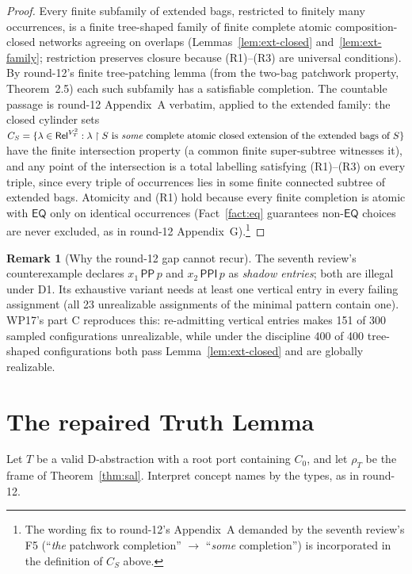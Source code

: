 \documentclass[11pt]{article}
\theoremstyle{definition}
\newtheorem{remark}[theorem]{Remark}
\newcommand{\EQ}{\mathsf{EQ}}
\newcommand{\PP}{\mathsf{PP}}
\newcommand{\PPI}{\mathsf{PPI}}
\newcommand{\Rel}{\mathsf{Rel}}
\begin{document}
\begin{proof}
Every finite subfamily of extended bags, restricted to finitely many
occurrences, is a finite tree-shaped family of finite complete atomic
composition-closed networks agreeing on overlaps
(Lemmas~\ref{lem:ext-closed} and~\ref{lem:ext-family}; restriction
preserves closure because (R1)--(R3) are universal conditions).  By
round-12's finite tree-patching lemma (from the two-bag patchwork
property, Theorem~2.5) each such subfamily has a satisfiable completion.
The countable passage is round-12 Appendix~A verbatim, applied to the
extended family: the closed cylinder sets
$C_S=\{\lambda\in\Rel^{V_T^2}:\lambda\restriction S \text{ is \emph{some}
complete atomic closed extension of the extended bags of }S\}$ have the
finite intersection property (a common finite super-subtree witnesses
it), and any point of the intersection is a total labelling satisfying
(R1)--(R3) on every triple, since every triple of occurrences lies in
some finite connected subtree of extended bags.  Atomicity and (R1) hold
because every finite completion is atomic with $\EQ$ only on identical
occurrences (Fact~\ref{fact:eq} guarantees non-$\EQ$ choices are never
excluded, as in round-12 Appendix~G).\footnote{The wording fix to
round-12's Appendix~A demanded by the seventh review's F5 (``\emph{the}
patchwork completion'' $\to$ ``\emph{some} completion'') is incorporated
in the definition of $C_S$ above.}
\end{proof}

\begin{remark}[Why the round-12 gap cannot recur]
The seventh review's counterexample declares $x_1\,\PP\,p$ and
$x_2\,\PPI\,p$ as \emph{shadow entries}; both are illegal under D1.  Its
exhaustive variant needs at least one vertical entry in every failing
assignment (all 23 unrealizable assignments of the minimal pattern
contain one).  WP17's part C reproduces this: re-admitting vertical
entries makes 151 of 300 sampled configurations unrealizable, while under
the discipline 400 of 400 tree-shaped configurations both pass
Lemma~\ref{lem:ext-closed} and are globally realizable.
\end{remark}

\section{The repaired Truth Lemma}\label{sec:truth}

Let $T$ be a valid D-abstraction with a root port containing $C_0$, and
let $\rho_T$ be the frame of Theorem~\ref{thm:sal}.  Interpret concept
names by the types, as in round-12.
\end{document}
